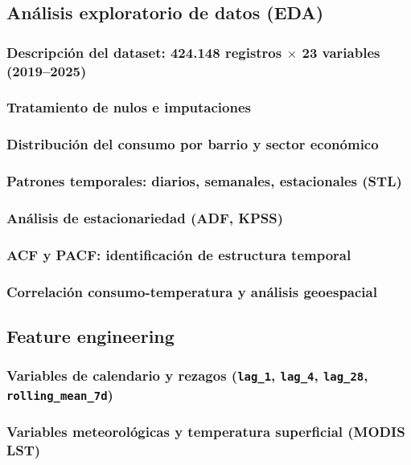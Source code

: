 \documentclass[12pt, a4paper]{article}
\begin{document}
\subsection{Análisis exploratorio de datos (EDA)}
\subsubsection{Descripción del dataset: 424.148 registros $\times$ 23 variables (2019--2025)}
\subsubsection{Tratamiento de nulos e imputaciones}
\subsubsection{Distribución del consumo por barrio y sector económico}
\subsubsection{Patrones temporales: diarios, semanales, estacionales (STL)}
\subsubsection{Análisis de estacionariedad (ADF, KPSS)}
\subsubsection{ACF y PACF: identificación de estructura temporal}
\subsubsection{Correlación consumo-temperatura y análisis geoespacial}

\subsection{Feature engineering}
\subsubsection{Variables de calendario y rezagos (\texttt{lag\_1}, \texttt{lag\_4}, \texttt{lag\_28}, \texttt{rolling\_mean\_7d})}
\subsubsection{Variables meteorológicas y temperatura superficial (MODIS LST)}
\end{document}
